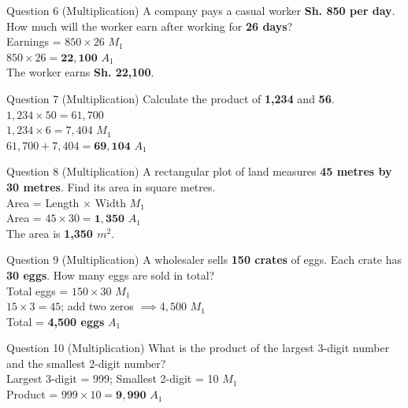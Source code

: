 \documentclass[12pt, a4paper, oneside]{article}
\begin{document}
\begin{solvingbox}{Question 6 (Multiplication)}
A company pays a casual worker \textbf{Sh. 850 per day}. How much will the worker earn after working for \textbf{26 days}? \\
Earnings = $850 \times 26$ \hfill $M_1$ \\
$850 \times 26 = \mathbf{22,100}$ \hfill $A_1$ \\
The worker earns \textbf{Sh. 22,100}.
\end{solvingbox}

\begin{solvingbox}{Question 7 (Multiplication)}
Calculate the product of \textbf{1,234} and \textbf{56}. \\
$1,234 \times 50 = 61,700$ \\
$1,234 \times 6 = 7,404$ \hfill $M_1$ \\
$61,700 + 7,404 = \mathbf{69,104}$ \hfill $A_1$
\end{solvingbox}

\begin{solvingbox}{Question 8 (Multiplication)}
A rectangular plot of land measures \textbf{45 metres by 30 metres}. Find its area in square metres. \\
Area = Length $\times$ Width \hfill $M_1$ \\
Area = $45 \times 30 = \mathbf{1,350}$ \hfill $A_1$ \\
The area is \textbf{1,350 $m^2$}.
\end{solvingbox}

\begin{solvingbox}{Question 9 (Multiplication)}
A wholesaler sells \textbf{150 crates} of eggs. Each crate has \textbf{30 eggs}. How many eggs are sold in total? \\
Total eggs = $150 \times 30$ \hfill $M_1$ \\
$15 \times 3 = 45$; add two zeros $\implies 4,500$ \hfill $M_1$ \\
Total = \textbf{4,500 eggs} \hfill $A_1$
\end{solvingbox}

\begin{solvingbox}{Question 10 (Multiplication)}
What is the product of the largest 3-digit number and the smallest 2-digit number? \\
Largest 3-digit = 999; Smallest 2-digit = 10 \hfill $M_1$ \\
Product = $999 \times 10 = \mathbf{9,990}$ \hfill $A_1$
\end{solvingbox}
\newpage
\end{document}
